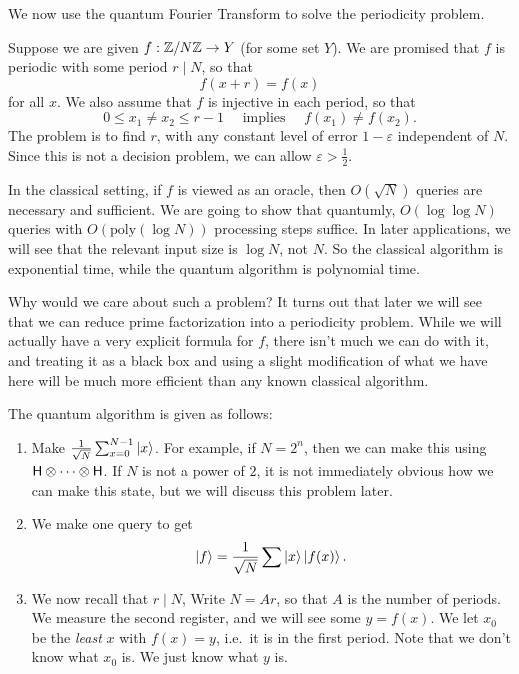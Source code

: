 We now use the quantum Fourier Transform to solve the periodicity problem.
\begin{eg}
  Suppose we are given $f: \mathbb{Z}/N\mathbb{Z} \to Y$ (for some set $Y$). We are promised that $f$ is periodic with some period $r \mid N$, so that
  \[
    f(x + r) = f(x)
  \]
  for all $x$. We also assume that $f$ is injective in each period, so that
  \[
    0 \leq x_1 \not= x_2 \leq r - 1\quad\text{ implies }\quad f(x_1) \not= f(x_2).
  \]
  The problem is to find $r$, with any constant level of error $1 - \varepsilon$ independent of $N$. Since this is not a decision problem, we can allow $\varepsilon > \frac{1}{2}$.

  In the classical setting, if $f$ is viewed as an oracle, then $O(\sqrt{N})$ queries are necessary and sufficient. We are going to show that quantumly, $O(\log \log N)$ queries with $O(\mathrm{poly}(\log N))$ processing steps suffice. In later applications, we will see that the relevant input size is $\log N$, not $N$. So the classical algorithm is exponential time, while the quantum algorithm is polynomial time.

  Why would we care about such a problem? It turns out that later we will see that we can reduce prime factorization into a periodicity problem. While we will actually have a very explicit formula for $f$, there isn't much we can do with it, and treating it as a black box and using a slight modification of what we have here will be much more efficient than any known classical algorithm.

  The quantum algorithm is given as follows:
  \begin{enumerate}
    \item Make $\frac{1}{\sqrt{N}} \sum_{x = 0}^{N - 1} \left\lvert x\right\rangle$. For example, if $N = 2^n$, then we can make this using $\mathsf{H} \otimes \cdots \otimes \mathsf{H}$. If $N$ is not a power of $2$, it is not immediately obvious how we can make this state, but we will discuss this problem later.

    \item We make one query to get
      \[
        \left\lvert f\right\rangle = \frac{1}{\sqrt{N}} \sum \left\lvert x\right\rangle \left\lvert f(x)\right\rangle.
      \]

    \item We now recall that $r \mid N$, Write $N = Ar$, so that $A$ is the number of periods. We measure the second register, and we will see some $y = f(x)$. We let $x_0$ be the \emph{least} $x$ with $f(x) = y$, i.e.\ it is in the first period. Note that we don't know what $x_0$ is. We just know what $y$ is.


\end{enumerate}
\end{eg}
